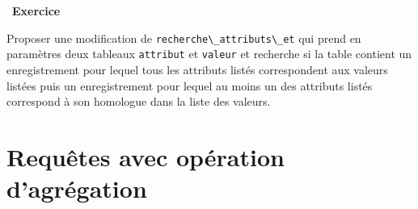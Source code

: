 \documentclass[
  11pt,
]{article}
\newcommand{\passthrough}[1]{#1}
\newcounter{exo}
\newenvironment{exercice}[1]
{\par \medskip   \addtocounter{exo}{1} \noindent  
\begin{bclogo}[arrondi =0.1,   noborder = true, logo=\bccrayon, marge=4]{~\textbf{Exercice} \textbf{\theexo} {\itshape #1} }  \par}
{
\end{bclogo}
 \par \bigskip }
\begin{document}
\begin{exercice}{}
Proposer une modification de
\passthrough{\lstinline!recherche\_attributs\_et!} qui prend en
paramètres deux tableaux \passthrough{\lstinline!attribut!} et
\passthrough{\lstinline!valeur!} et recherche si la table contient un
enregistrement pour lequel tous les attributs listés correspondent aux
valeurs listées puis un enregistrement pour lequel au moins un des
attributs listés correspond à son homologue dans la liste des valeurs.

\end{exercice}

\hypertarget{requuxeates-avec-opuxe9ration-dagruxe9gation}{%
\section{Requêtes avec opération
d'agrégation}\label{requuxeates-avec-opuxe9ration-dagruxe9gation}}
\end{document}
